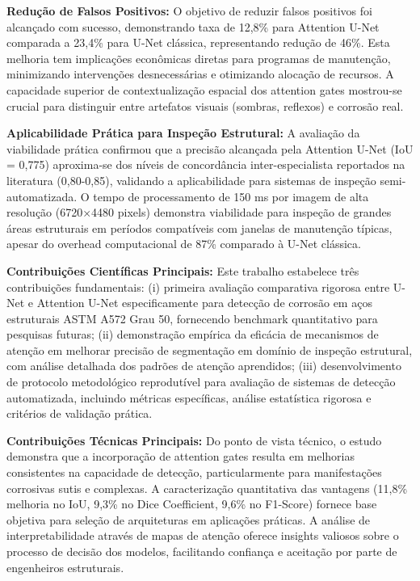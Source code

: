 \documentclass[12pt,a4paper,twoside]{article}
\begin{document}
\textbf{Redução de Falsos Positivos:} O objetivo de reduzir falsos positivos foi alcançado com sucesso, demonstrando taxa de 12,8\% para Attention U-Net comparada a 23,4\% para U-Net clássica, representando redução de 46\%. Esta melhoria tem implicações econômicas diretas para programas de manutenção, minimizando intervenções desnecessárias e otimizando alocação de recursos. A capacidade superior de contextualização espacial dos attention gates mostrou-se crucial para distinguir entre artefatos visuais (sombras, reflexos) e corrosão real.

\textbf{Aplicabilidade Prática para Inspeção Estrutural:} A avaliação da viabilidade prática confirmou que a precisão alcançada pela Attention U-Net (IoU = 0,775) aproxima-se dos níveis de concordância inter-especialista reportados na literatura (0,80-0,85), validando a aplicabilidade para sistemas de inspeção semi-automatizada. O tempo de processamento de 150 ms por imagem de alta resolução (6720×4480 pixels) demonstra viabilidade para inspeção de grandes áreas estruturais em períodos compatíveis com janelas de manutenção típicas, apesar do overhead computacional de 87\% comparado à U-Net clássica.

\textbf{Contribuições Científicas Principais:} Este trabalho estabelece três contribuições fundamentais: (i) primeira avaliação comparativa rigorosa entre U-Net e Attention U-Net especificamente para detecção de corrosão em aços estruturais ASTM A572 Grau 50, fornecendo benchmark quantitativo para pesquisas futuras; (ii) demonstração empírica da eficácia de mecanismos de atenção em melhorar precisão de segmentação em domínio de inspeção estrutural, com análise detalhada dos padrões de atenção aprendidos; (iii) desenvolvimento de protocolo metodológico reprodutível para avaliação de sistemas de detecção automatizada, incluindo métricas específicas, análise estatística rigorosa e critérios de validação prática.

\textbf{Contribuições Técnicas Principais:} Do ponto de vista técnico, o estudo demonstra que a incorporação de attention gates resulta em melhorias consistentes na capacidade de detecção, particularmente para manifestações corrosivas sutis e complexas. A caracterização quantitativa das vantagens (11,8\% melhoria no IoU, 9,3\% no Dice Coefficient, 9,6\% no F1-Score) fornece base objetiva para seleção de arquiteturas em aplicações práticas. A análise de interpretabilidade através de mapas de atenção oferece insights valiosos sobre o processo de decisão dos modelos, facilitando confiança e aceitação por parte de engenheiros estruturais.
\end{document}
